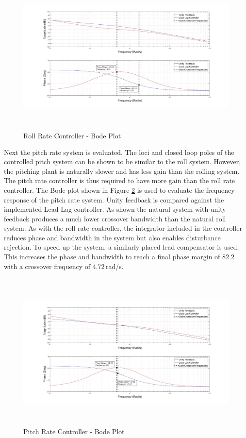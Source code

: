 	\begin{figure}[H]
		\centering
		\includegraphics[height = 8cm]{../Design/Matlab/Controllers/roll_rate_bode.jpg}
		\caption{Roll Rate Controller -  Bode Plot}
		\label{IM_RollRateControlBode}
	\end{figure}
	
	Next the pitch rate system is evaluated. The loci and closed loop poles of the controlled pitch system can be shown to be similar to the roll system. However, the pitching plant is naturally slower and has less gain than the rolling system. The pitch rate controller is thus required to have more gain than the roll rate controller. The Bode plot shown in Figure \ref{IM_PitchRateControlBode} is used to evaluate the frequency response of the pitch rate system. Unity feedback is compared against the implemented Lead-Lag controller. As shown the natural system with unity feedback produces a much lower crossover bandwidth than the natural roll system. As with the roll rate controller, the integrator included in the controller reduces phase and bandwidth in the system but also enables disturbance rejection. To speed up the system, a similarly placed lead compensator is used. This increases the phase and bandwidth to reach a final phase margin of $82.2$\textdegree\,with a crossover frequency of $4.72$\,rad/s.
	
	\begin{figure}[H]
		\centering
		\includegraphics[height = 8cm]{../Design/Matlab/Controllers/pitch_rate_bode.jpg}
		\caption{Pitch Rate Controller -  Bode Plot}
		\label{IM_PitchRateControlBode}
	\end{figure}
		
